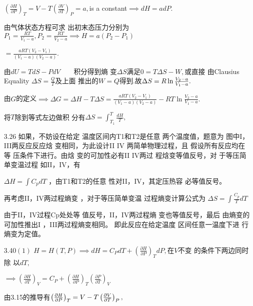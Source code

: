 \documentclass{ctexart}
\begin{document}
$\left( \frac{\partial H}{\partial P}\right) _{T}=V-T\left( \frac{\partial V%
}{\partial T}\right) _{P}=a,$is a constant$\implies dH=adP.$

由气体状态方程可求%
出初末态压力分别为$%
P_{1}=\frac{RT}{V_{1}-a},P_{2}=\frac{RT}{V_{2}-a}\implies H=a\left(
P_{2}-P_{1}\right) $

$=\frac{aRT\left( V_{2}-V_{1}\right) }{\left( V_{1}-a\right) \left(
V_{2}-a\right) }.$

由\qquad $dU=TdS-PdV\qquad $积分得到熵%
变$\Delta S$满足$0=T\Delta S-W,$或直接%
由Clausius Equality $\Delta S=\frac{Q}{T}$及上面%
推出的$W=Q$得到.故$\Delta S=R\ln \frac{%
V_{2}-a}{V_{1}-a}.$

由$G$的定义$\implies \Delta G=\Delta H-T\Delta S=%
\frac{aRT\left( V_{2}-V_{1}\right) }{\left( V_{1}-a\right) \left(
V_{2}-a\right) }-RT\ln \frac{V_{2}-a}{V_{1}-a}.$

将$T$除到等式左边做积%
分有$\Delta S=\int_{T_{1}}^{T}\frac{dH}{T},$

\bigskip 

\bigskip 

\bigskip 

\bigskip 

\bigskip 

3.26 如果，不妨设在给定%
温度区间内T1和T2是任意%
两个温度值，题意为%
图中I，III两反应反应焓%
变相同，为此设计II IV 
两简单物理过程，且%
假设所有反应均在等%
压条件下进行。由焓%
变的可加性必有II IV两过%
程焓变等值反号，对%
于等压简单变温过程%
如II，IV，有

$\Delta H=\int C_{p}dT$ ，由T1和T2的任意%
性对II，IV，其定压热容%
必等值反号。

再考虑II，IV两过程熵变%
，对于等压简单变温%
过程熵变计算公式为 $%
\Delta S=\int \frac{C_{p}}{T}dT$ 

由于II，IV过程Cp处处等%
值反号，II，IV两过程熵%
变也等值反号，最后%
由熵变的可加性推出I%
，III两过程熵变相同。%
即此反应在给定温度%
区间任意一温度下进%
行熵变为定值。


3.40$\left( 1\right) $ $H=H\left( T,P\right) \implies dH=C_{P}dT+\left( 
\frac{\partial H}{\partial P}\right) _{T}dP,$在$V$不变%
的条件下两边同时除%
以$dT,$

$\implies \left( \frac{\partial H}{\partial T}\right) _{V}=C_{P}+\left( 
\frac{\partial H}{\partial P}\right) _{T}\left( \frac{\partial P}{\partial T}%
\right) _{V}$

由3.15的推导有$\left( \frac{\partial H}{%
\partial P}\right) _{T}=V-T\left( \frac{\partial V}{\partial T}\right) _{P},$
\end{document}
